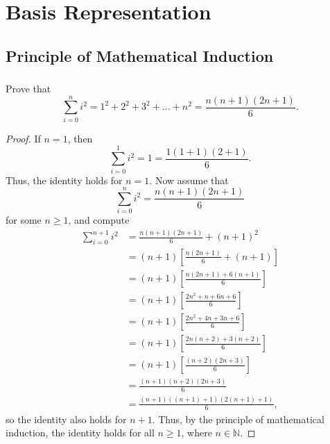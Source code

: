 \documentclass[11pt]{article}
\begin{document}
\pagestyle{fancy}
\fancyhead{}
\tableofcontents
\newpage
\fancyhead[L]{\leftmark}
\fancyhead[C]{}
\fancyhead[R]{\rightmark}

\section{Basis Representation}
\subsection{Principle of Mathematical Induction}
\subsubsection{}
Prove that
\[
	\sum_{i=0}^{n} i^2 = 1^2 + 2^2 + 3^2 + ... + n^2 = \frac{n(n+1)(2n+1)}{6}.
\]
\begin{proof}
	If $n=1$, then
	\[
		\sum_{i=0}^{1} i^2 = 1 = \frac{1(1+1)(2+1)}{6}.
	\]
	Thus, the identity holds for $n=1$. Now assume that
	\[
		\sum_{i=0}^{n} i^2 = \frac{n(n+1)(2n+1)}{6}
	\]
	for some $n \geq 1$, and compute
	\begin{align*}
		\sum_{i=0}^{n+1} i^2 & = \frac{n(n+1)(2n+1)}{6} + (n+1)^2 \\
				     & = (n+1) \left[ \frac{n(2n+1)}{6} + (n+1) \right] \\
				     & = (n+1) \left[ \frac{n(2n+1) + 6(n+1)}{6} \right] \\
				     & = (n+1) \left[ \frac{2n^2 + n + 6n + 6}{6} \right] \\
				     & = (n+1) \left[ \frac{2n^2 + 4n + 3n + 6}{6} \right] \\
				     & = (n+1) \left[ \frac{2n(n+2) + 3(n+2)}{6} \right] \\
				     & = (n+1) \left[ \frac{(n+2)(2n+3)}{6} \right] \\
				     & = \frac{(n+1)(n+2)(2n+3)}{6} \\
				     & = \frac{(n+1)((n+1)+1)(2(n+1)+1)}{6},
	\end{align*}
	so the identity also holds for $n+1$. Thus, by the principle of mathematical induction,
	the identity holds for all $n \geq 1$, where $n \in \mathbb{N}$.
\end{proof}

\newpage

\end{document}
